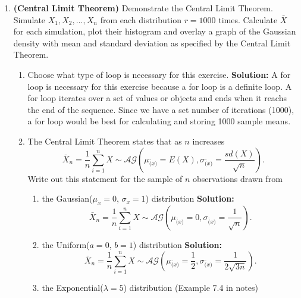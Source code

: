 \documentclass{article}
\begin{document}
\begin{enumerate}
\begin{enumerate}
\end{enumerate}
\newpage
\item \textbf{(Central Limit Theorem)} Demonstrate the Central Limit Theorem.
Simulate $X_1, X_2, ..., X_n$ from each distribution $r=1000$ times. Calculate
$\bar{X}$ for each simulation, plot their histogram and overlay a graph of the 
Gaussian density with mean and standard deviation as specified by the Central 
Limit Theorem.
  \begin{enumerate}
    \item Choose what type of loop is necessary for this exercise.
    \newline
    \textbf{Solution:}
    \newline
    A for loop is necessary for this exercise because a for loop is a definite loop. A for loop iterates over a set of values or objects and ends when it reachs the end of the sequence. Since we have a set number of iterations (1000), a for loop would be best for calculating and storing 1000 sample means. 
    \item The Central Limit Theorem states that as $n$ increases
    \[\bar{X}_n = \frac{1}{n} \sum_{i=1}^n {X} \sim \mathcal{AG}\left(\mu_{\bar(x)} = E(X), \sigma_{\bar(x)} = \frac{sd(X)}{\sqrt{n}}\right).\]
    Write out this statement for the sample of $n$ observations drawn from 
    \begin{enumerate}
      \item the Gaussian($\mu_x=0$, $\sigma_x=1$) distribution
      \newline
      \textbf{Solution:}
      \newline
      \[\bar{X}_n = \frac{1}{n} \sum_{i=1}^n {X} \sim \mathcal{AG}\left(\mu_{\bar(x)} = 0, \sigma_{\bar(x)} = \frac{1}{\sqrt{n}}\right).\] 
      \item the Uniform($a=0$, $b=1$) distribution
      \newline
      \textbf{Solution:}
      \newline
       \[\bar{X}_n = \frac{1}{n} \sum_{i=1}^n {X} \sim \mathcal{AG}\left(\mu_{\bar(x)} = \frac{1}{2}, \sigma_{\bar(x)} = \frac{1}{2\sqrt{3n}}\right).\]
      \item the Exponential($\lambda=5$) distribution (Example 7.4 in notes)

\end{enumerate}
\end{enumerate}
\end{enumerate}
\end{document}
